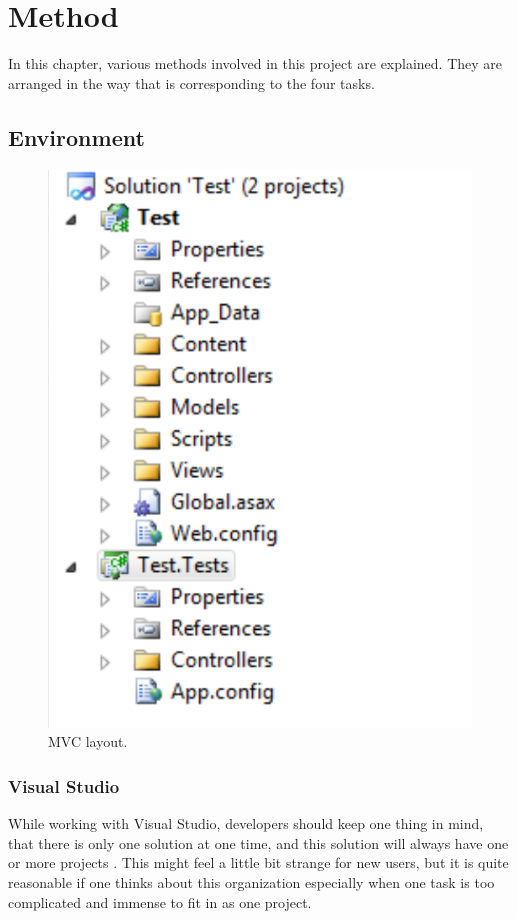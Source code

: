 \chapter{Method}
\thispagestyle{empty}
In this chapter, various methods involved in this project are explained. They are arranged in the way that is corresponding to the four tasks.
\section{Environment}
\begin{figure}[t]
	\begin{center}
		\includegraphics[scale=0.4]{mvcOriginalLayout.png}
	\end{center}
	\caption{MVC layout.}
	\label{fig:mvc_layout}
\end{figure}
\subsection{Visual Studio}
While working with Visual Studio, developers should keep one thing in mind, that there is only one solution at one time, and this solution will always
have one or more projects \cite{vs_book}. This might feel a little bit strange for new users, but it is quite reasonable if one thinks about this 
organization especially when one task is too complicated and immense to fit in as one project.

